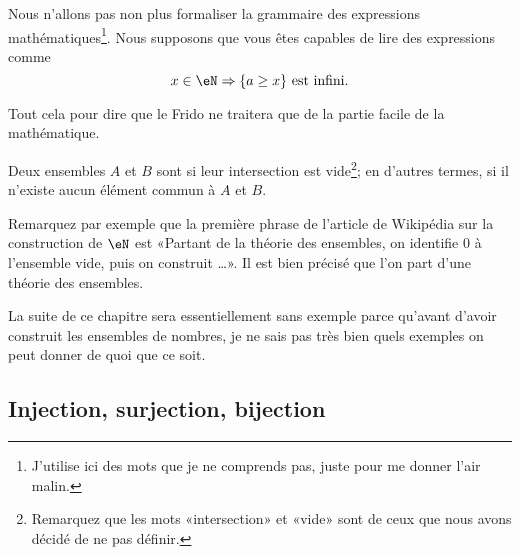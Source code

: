 \begin{normaltext}
    Nous n'allons pas non plus formaliser la grammaire des expressions mathématiques\footnote{J'utilise ici des mots que je ne comprends pas, juste pour me donner l'air malin.}. Nous supposons que vous êtes capables de lire des expressions comme
    \begin{equation}
        x\in \eN\Rightarrow\{ a\geq x \}\text{ est infini}.
    \end{equation}
\end{normaltext}

Tout cela pour dire que le Frido ne traitera que de la partie facile de la mathématique.

\begin{definition}\label{DefEnsemblesDisjoints}
    Deux ensembles $A$ et $B$ sont  si leur intersection est vide\footnote{Remarquez que les mots «intersection» et «vide» sont de ceux que nous avons décidé de ne pas définir.}; en d'autres termes, si il n'existe aucun élément commun à $A$ et $B$.
\end{definition}

\begin{normaltext}
    Remarquez par exemple que la première phrase de l'article de Wikipédia sur la construction de \( \eN\) est «Partant de la théorie des ensembles, on identifie 0 à l'ensemble vide, puis on construit \ldots». Il est bien précisé que l'on part d'une théorie des ensembles.
\end{normaltext}

\begin{normaltext}
    La suite de ce chapitre sera essentiellement sans exemple parce qu'avant d'avoir construit les ensembles de nombres, je ne sais pas très bien quels exemples on peut donner de quoi que ce soit.
\end{normaltext}


\subsection{Injection, surjection, bijection}

